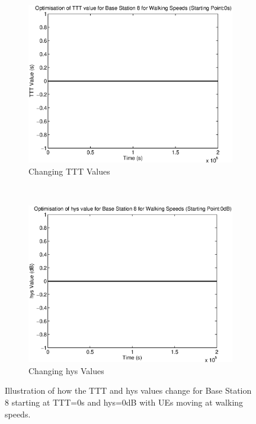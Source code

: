 \begin{figure}[H]
        \centering
        \begin{subfigure}[b]{0.49\textwidth}
                \includegraphics[width=\textwidth]{figures/graphs/walklow/TTT8.eps}
                \caption{Changing TTT Values}
        \end{subfigure}%
        ~ %
        \begin{subfigure}[b]{0.49\textwidth}
                \includegraphics[width=\textwidth]{figures/graphs/walklow/hys8.eps}
                \caption{Changing hys Values}
        \end{subfigure}
        \caption{Illustration of how the TTT and hys values change for Base Station 8 starting at TTT=0s and hys=0dB with UEs moving at walking speeds.}
\end{figure}
